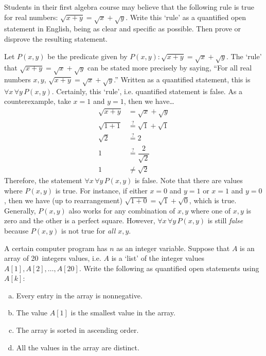 \documentclass[11pt,letterpaper]{article}
\begin{document}
\newpage



 Students in their first algebra course may believe that the following rule is true for real numbers: $\sqrt{x + y}= \sqrt{x} + \sqrt{y}$. Write this `rule' as a quantified open statement in English, being as clear and specific as possible. Then prove or disprove the resulting statement. \pspace

\sol Let $P(x, y)$ be the predicate given by $P(x, y): \sqrt{x + y}= \sqrt{x} + \sqrt{y}$. The `rule' that $\sqrt{x + y}= \sqrt{x} + \sqrt{y}$ can be stated more precisely by saying, ``For all real numbers $x, y$, $\sqrt{x + y}= \sqrt{x} + \sqrt{y}$.'' Written as a quantified statement, this is $\forall x\, \forall y\, P(x, y)$. Certainly, this `rule', i.e. quantified statement is false. As a counterexample, take $x= 1$ and $y= 1$, then we have\dots
	\[
	\begin{aligned}
	\sqrt{x + y}&= \sqrt{x} + \sqrt{y} \\[0.3cm]
	\sqrt{1 + 1}&\stackrel{?}{=} \sqrt{1} + \sqrt{1} \\[0.3cm]
	\sqrt{2}&\stackrel{?}{=} 2 \\[0.3cm]
	1&\stackrel{?}{=} \dfrac{2}{\sqrt{2}} \\[0.3cm]
	1&\neq \sqrt{2}
	\end{aligned}
	\]
Therefore, the statement $\forall x\, \forall y\, P(x, y)$ is false. Note that there are values where $P(x, y)$ is true. For instance, if either $x= 0$ and $y= 1$ or $x= 1$ and $y= 0$, then we have (up to rearrangement) $\sqrt{1 + 0}= \sqrt{1} + \sqrt{0}$, which is true. Generally, $P(x, y)$ also works for any combination of $x, y$ where one of $x, y$ is zero and the other is a perfect square. However, $\forall x\, \forall y\, P(x, y)$ is still \textit{false} because $P(x, y)$ is not true for \textit{all} $x, y$. 



\newpage



 A certain computer program has $n$ as an integer variable. Suppose that $A$ is an array of 20~integers values, i.e. $A$ is a `list' of the integer values $A[1], A[2], \ldots, A[20]$. Write the following as quantified open statements using $A[k]$:
	\begin{enumerate}[(a)]
	\item Every entry in the array is nonnegative.
	\item The value $A[1]$ is the smallest value in the array.
	\item The array is sorted in ascending order. 
	\item All the values in the array are distinct. 
	\end{enumerate} \pspace
\end{document}
